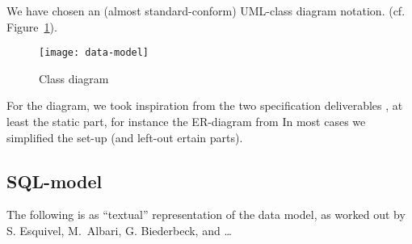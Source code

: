 We have chosen an (almost standard-conform) UML-class diagram notation.  (cf.
Figure~\ref{fig:classdiagram}).


\begin{figure}[htbp]
  \centering
  \texttt{[image: data-model]}
  \caption{Class diagram}
  \label{fig:classdiagram}
\end{figure}

For the diagram, we took inspiration from the two specification deliverables
\cite{coma:spec1} \cite{coma:spec2}, at least the static part, for instance
the ER-diagram from \cite{coma:spec1} In most cases we simplified the set-up
(and left-out ertain parts).








\subsection*{SQL-model}
\label{sec:datamodel.sql}
%

The following is as ``textual'' representation of the data model, as worked
out by S. Esquivel, M.\ Albari, G. Biederbeck, and \ldots






\newpage




\newpage










%


%

